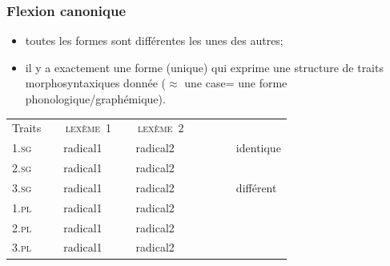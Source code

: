 \begin{frame}
\frametitle{Flexion canonique}
\begin{itemize}
\item toutes les formes sont différentes les unes des autres;
\item il y a exactement une forme (unique) qui exprime une structure
  de traits morphosyntaxiques donnée ($\approx$ une case= une forme phonologique/graphémique).
\end{itemize}

\scriptsize
\begin{table}
\begin{tabular}{|l| p{1mm}|ll|p{1mm}|ll|p{1mm}cl}
\cline{1-1}\cline{3-4}\cline{6-7}
Traits&&\multicolumn{2}{|c|}{\cellcolor{white}\textsc{ lexème~1}}&&\multicolumn{2}{|c|}{\cellcolor{white}\textsc{ lexème~2}}&&\\
\cline{1-1}\cline{3-4}\cline{6-7}
\textsc{1.sg}&& \cellcolor{mandarine}radical1&\cellcolor{mandarine}{\em --ma}&&\cellcolor{mandarine}radical2&\cellcolor{mandarine}{\em
  --ma}&&\cellcolor{ciel}~~~&identique\\
\cline{1-1}\cline{3-4}\cline{6-7}
\textsc{2.sg}& &\cellcolor{mandarine}radical1&\cellcolor{mandarine}{\em --sa}&&\cellcolor{mandarine}radical2&\cellcolor{mandarine}{\em --sa}&&&\\
\cline{1-1}\cline{3-4}\cline{6-7}
\textsc{3.sg}&& \cellcolor{mandarine}radical1&\cellcolor{mandarine}{\em --ta}&&\cellcolor{mandarine}radical2& \cellcolor{mandarine}{\em
  --ta}&&\cellcolor{mandarine}&différent\\
\cline{1-1}\cline{3-4}\cline{6-7}
\textsc{1.pl}&&\cellcolor{mandarine}radical1&\cellcolor{mandarine}{\em --mo}&&\cellcolor{mandarine}radical2&\cellcolor{mandarine}{\em --mo}&&\\
\cline{1-1}\cline{3-4}\cline{6-7}
\textsc{2.pl}&&\cellcolor{mandarine}radical1&\cellcolor{mandarine}{\em --so}&&\cellcolor{mandarine}radical2&\cellcolor{mandarine}{\em --so}&&\\
\cline{1-1}\cline{3-4}\cline{6-7}
\textsc{3.pl}&&\cellcolor{mandarine}radical1& \cellcolor{mandarine}{\em
  --to}&&\cellcolor{mandarine}radical2&\cellcolor{mandarine}{\em --to}&&\\
\cline{1-1}\cline{3-4}\cline{6-7}
\end{tabular}\\[1mm]
\end{table}
\end{frame}


